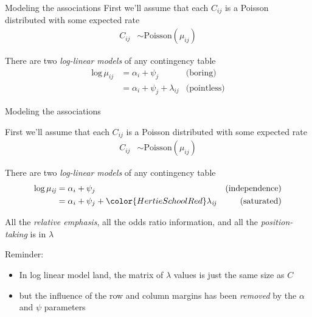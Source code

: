 \documentclass{hertieteaching}
\begin{document}
\begin{frame}{Modeling the associations}
First we'll assume that each $C_\mathit{ij}$ is a Poisson distributed with some expected rate
\begin{align*}
C_\mathit{ij} & \sim \text{Poisson}(\mu_\mathit{ij}) 
\end{align*}

\pause 

There are two \textit{log-linear models} of any contingency table
\begin{align*}
\text{log}\, \mu_\mathit{ij}  & = \alpha_{i} + \psi_{j} & \text{({boring})}\\ 
              & = \alpha_i + \psi_{j} + \lambda_\mathit{ij} & \text{({pointless})}
\end{align*}

\end{frame}

\begin{frame}{Modeling the associations}
	
First we'll assume that each $C_\mathit{ij}$ is a Poisson distributed with some expected rate
\begin{align*}
C_\mathit{ij} & \sim \text{Poisson}(\mu_\mathit{ij}) 
\end{align*}

	
There are two \textit{log-linear models} of any contingency table
\begin{align*}
\text{log}\, \mu_\mathit{ij} & = \alpha_{i} + \psi_{j} & \text{(independence)}\\
              & = \alpha_i + \psi_{j} + {\color{HertieSchoolRed} \lambda_\mathit{ij}} & \text{(saturated)}
\end{align*}

\pause

All the \textit{relative emphasis}, all the odds ratio information, and all the \textit{position-taking} is in $\lambda$

Reminder: 
\begin{itemize}
  \item In log linear model land, the matrix of $\lambda$ values is just the same size as $C$
  \item but the influence of the row and column margins has been \textit{removed} by the $\alpha$ and $\psi$ parameters
\end{itemize}
 


\end{frame}
\end{document}
